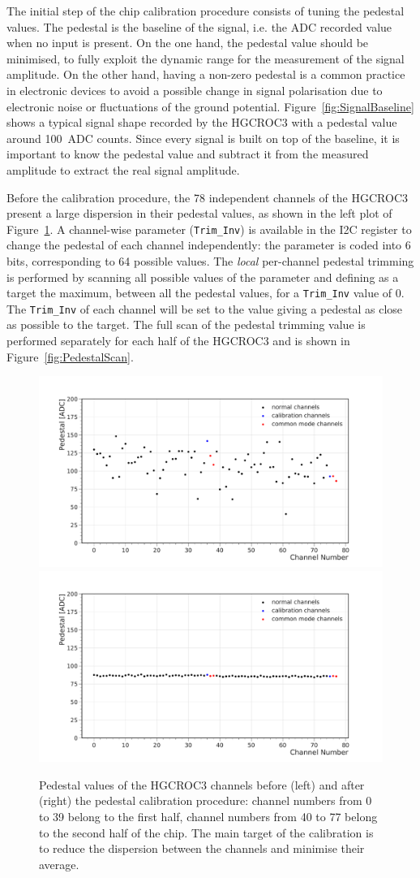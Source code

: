 The initial step of the chip calibration procedure consists of tuning the pedestal values. The pedestal is the baseline of the signal, i.e. the ADC recorded value when no input is present. On the one hand, the pedestal value should be minimised, to fully exploit the dynamic range for the measurement of the signal amplitude. On the other hand, having a non-zero pedestal is a common practice in electronic devices to avoid a possible change in signal polarisation due to electronic noise or fluctuations of the ground potential.
Figure~\ref{fig:SignalBaseline} shows a typical signal shape recorded by the HGCROC3 with a pedestal value around 100~ADC counts. Since every signal is built on top of the baseline, it is important to know the pedestal value and subtract it from the measured amplitude to extract the real signal amplitude.

Before the calibration procedure, the 78 independent channels of the HGCROC3 present a large dispersion in their pedestal values, as shown in the left plot of Figure~\ref{fig:Pedestal}. 
A channel-wise parameter (\texttt{Trim\_Inv}) is available in the I2C register to change the pedestal of each channel independently: the parameter is coded into 6 bits, corresponding to 64 possible values.
The \textit{local} per-channel pedestal trimming is performed by scanning all possible values of the parameter and defining as a target the maximum, between all the pedestal values, for a \texttt{Trim\_Inv} value of 0. The \texttt{Trim\_Inv} of each channel will be set to the value giving a pedestal as close as possible to the target.
The full scan of the pedestal trimming value is performed separately for each half of the HGCROC3 and is shown in Figure~\ref{fig:PedestalScan}.

\begin{figure}
    \centering
    \includegraphics[width=0.49\linewidth]{Figures/HGCAL/Pedestal_Before.pdf}
    \includegraphics[width=0.49\linewidth]{Figures/HGCAL/Pedestal_After.pdf}
    \caption{Pedestal values of the HGCROC3 channels before (left) and after (right) the pedestal calibration procedure: channel numbers from 0 to 39 belong to the first half, channel numbers from 40 to 77 belong to the second half of the chip. The main target of the calibration is to reduce the dispersion between the channels and minimise their average.}
    \label{fig:Pedestal}
\end{figure}


